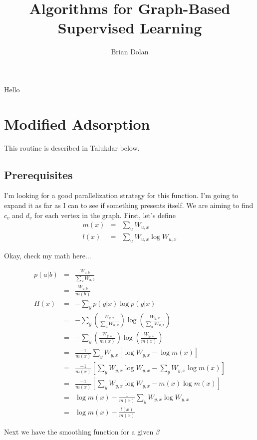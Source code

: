 \documentclass{article}
\begin{document}
\title{Algorithms for Graph-Based Supervised Learning}
\author{Brian Dolan}
\maketitle
Hello

\section{Modified Adsorption}

This routine is described in Talukdar below.

\subsection{Prerequisites}

I'm looking for a good parallelization strategy for this function.  I'm going to expand it as far as I can to see if something presents itself.  We are aiming to find $c_v$ and $d_v$ for each vertex in the graph.  First, let's define 
\begin{eqnarray}
m(x) &=& \sum_u W_{u,x} \\
l(x) &=& \sum_u W_{u,x} \log W_{u,x}
\end{eqnarray}

Okay, check my math here...

\begin{eqnarray}
p(a|b) &=& \frac{W_{a,b}}{\sum_u W_{u,b}} \\
  &=& \frac{W_{a,b}}{m(b)} \\
H(x) &=& -\sum_y p(y|x) \log p(y|x) \\
&=& -\sum _y \left( \frac{W_{y,x}} {\sum_u W_{u,x} } \right) \log \left(  \frac{W_{y,x}}{\sum_u W_{u,x} } \right) \\
&=& -\sum _y \left( \frac{W_{y,x}} {m(x) } \right) \log \left(  \frac{W_{y,x}}{m(x) } \right) \\
&=& \frac{-1}{m(x)} \sum_y W_{y,x} \left[ \log W_{y,x} - \log m(x) \right] \\
&=& \frac{-1}{m(x)} \left[ \sum_y W_{y,x} \log W_{y,x} -  \sum_y W_{y,x} \log m(x) \right] \\
&=& \frac{-1}{m(x)} \left[ \sum_y W_{y,x} \log W_{y,x} - m(x) \log m(x) \right] \\
&=& \log m(x) -  \frac{1}{m(x)}\sum_y W_{y,x} \log W_{y,x} \\
&=& \log m(x) - \frac{l(x)}{m(x)}
\end{eqnarray}

Next we have the smoothing function for a given $\beta$
\end{document}
